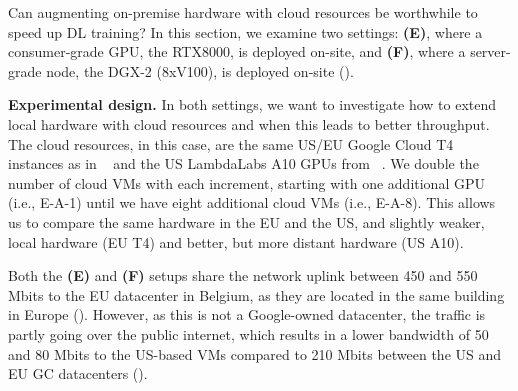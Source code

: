 Can augmenting on-premise hardware with cloud resources be worthwhile to speed up DL training?
In this section, we examine two settings: \textbf{(E)}, where a consumer-grade GPU, the RTX8000, is deployed on-site, and \textbf{(F)}, where a server-grade node, the DGX-2 (8xV100), is deployed on-site ().

\textbf{Experimental design.} In both settings, we want to investigate how to extend local hardware with cloud resources and when this leads to better throughput.
The cloud resources, in this case, are the same US/EU Google Cloud T4 instances as in ~ and the US LambdaLabs A10 GPUs from ~.
We double the number of cloud VMs with each increment, starting with one additional GPU (i.e., E-A-1) until we have eight additional cloud VMs (i.e., E-A-8). 
This allows us to compare the same hardware in the EU and the US, and slightly weaker, local hardware (EU T4) and better, but more distant hardware (US A10).

Both the \textbf{(E)} and \textbf{(F)} setups share the network uplink between 450 and 550 Mbits to the EU datacenter in Belgium, as they are located in the same building in Europe (). 
However, as this is not a Google-owned datacenter, the traffic is partly going over the public internet, which results in a lower bandwidth of 50 and 80 Mbits to the US-based VMs compared to 210 Mbits between the US and EU GC datacenters ().

